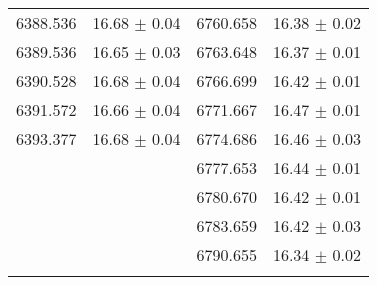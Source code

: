 \documentclass[iop]{emulateapj}
\begin{document}
\begin{table}
\begin{tabular}{cccc}
   6388.536  &   16.68  $\pm$    0.04        &    6760.658  &   16.38  $\pm$    0.02          \\
   6389.536  &   16.65  $\pm$    0.03        &    6763.648  &   16.37  $\pm$    0.01          \\
   6390.528  &   16.68  $\pm$    0.04        &    6766.699  &   16.42  $\pm$    0.01          \\
   6391.572  &   16.66  $\pm$    0.04        &    6771.667  &   16.47  $\pm$    0.01          \\
   6393.377  &   16.68  $\pm$    0.04        &    6774.686  &   16.46  $\pm$    0.03          \\
   &                               &    6777.653  &   16.44  $\pm$    0.01          \\
   &                               &    6780.670  &   16.42  $\pm$    0.01          \\
   &                               &    6783.659  &   16.42  $\pm$    0.03          \\
   &                               &    6790.655  &   16.34  $\pm$    0.02 			\\
	\tableline
	\end{tabular}
	\label{table1}


\end{table}
\end{document}
